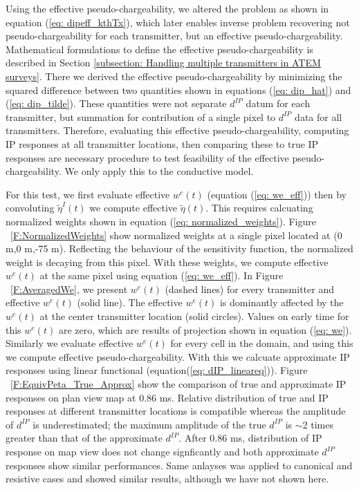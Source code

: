 \documentclass[extra,mreferee]{gji}
\newcommand{\peta}{\tilde{\eta}}
\newcommand{\dip}{d^{IP}}
\begin{document}
Using the effective pseudo-chargeability, we altered the problem as shown in equation (\ref{eq: dipeff_kthTx}), which later enables inverse problem recovering not pseudo-chargeability for each transmitter, but an effective pseudo-chargeability. Mathematical formulations to define the effective pseudo-chargeability is described in Section \ref{subsection: Handling multiple transmitters in ATEM surveys}. There we derived the effective pseudo-chargeability by minimizing the squared difference between two quantities shown in equations (\ref{eq: dip_hat}) and (\ref{eq: dip_tilde}). These quantities were not separate $\dip$ datum for each transmitter, but summation for contribution of a single pixel to $\dip$ data for all transmitters. 
Therefore, evaluating this effective pseudo-chargeability, computing IP responses at all transmitter locations, then comparing these to true IP responses are necessary procedure to test feasibility of the effective pseudo-chargeability. 
We only apply this to the conductive model. 

For this test, we first evaluate effective $w^e(t)$ (equation (\ref{eq: we_eff})) then by convoluting $\peta^I(t)$ we compute effective $\peta(t)$. 
This requires calcuating normalized weights shown in equation (\ref{eq: normalized_weights}). 
Figure ~\ref{F:NormalizedWeights} show normalized weights at a single pixel located at (0 m,0 m,-75 m). Reflecting the behaviour of the sensitivity function, the normalized weight is decaying from this pixel. 
With these weights, we compute effective $w^e(t)$ at the same pixel using equation (\ref{eq: we_eff}). 
In Figure ~\ref{F:AveragedWe}, we present $w^e(t)$ (dashed lines) for every transmitter and effective $w^e(t)$ (solid line).
The effective $w^e(t)$ is dominantly affected by the $w^e(t)$ at the center transmitter location (solid circles). Values on early time for this $w^e(t)$ are zero, which are results of projection shown in equation (\ref{eq: we}).
Similarly we evaluate effective $w^e(t)$ for every cell in the domain, and using this we compute effective pseudo-chargeability.
With this we calcuate approximate IP responses using linear functional (equation(\ref{eq: dIP_lineareq})).
Figure ~\ref{F:EquivPeta_True_Approx} show the comparison of true and approximate IP responses on plan view map at 0.86 ms. Relative distribution of true and IP responses at different transmitter locations is compatible whereas the amplitude of $\dip$ is underestimated; the maximum amplitude of the true $\dip$ is $\sim$2 times greater than that of the approximate $\dip$. 
After 0.86 ms, distribution of IP response on map view does not change signficantly and both approximate $\dip$ responses show similar performances.
Same anlayses was applied to canonical and resistive cases and showed similar results, although we have not shown here. 
\end{document}
